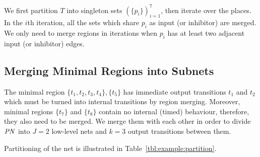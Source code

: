 \documentclass[a4paper,10pt,twoside,openright]{memoir}
\newcommand*{\PN}{\textnormal{\emph{PN}}}
\begin{document}
We first partition $T$ into singleton sets $(\{p_i\})_{i = 1}^7$, then
iterate over the places. In the $i$th iteration, all the sets which
share $p_i$ as input (or inhibitor) are merged. We only need to merge
regions in iterations when $p_i$ has at least two adjacent input (or
inhibitor) edges.


\subsection{Merging Minimal Regions into Subnets}

The minimal region $\{t_1, t_2, t_3, t_4\}, \{t_5\}$ has immediate
output transitions $t_1$ and $t_2$ which must be turned into internal
transitions by region merging. Moreover, minimal regions $\{t_7\}$ and
$\{t_8\}$ contain no internal (timed) behaviour, therefore, they also
need to be merged. We merge them with each other in order to divide
$\PN$ into $J = 2$ low-level nets and $k = 3$ output transitions
between them.

Partitioning of the net is illustrated in
Table~\ref{tbl:example:partition}.
\end{document}
